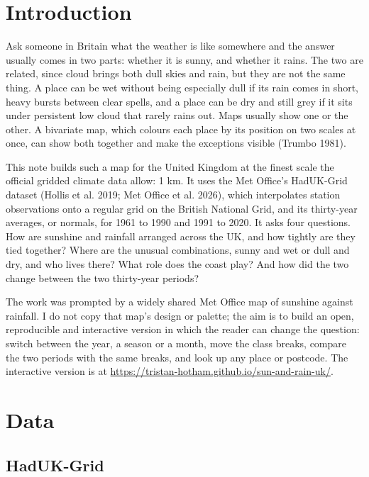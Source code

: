 \documentclass[11pt,a4paper]{article}
\begin{document}
\section{Introduction}

Ask someone in Britain what the weather is like somewhere and the answer usually comes in two parts: whether it is sunny, and whether it rains. The two are related, since cloud brings both dull skies and rain, but they are not the same thing. A place can be wet without being especially dull if its rain comes in short, heavy bursts between clear spells, and a place can be dry and still grey if it sits under persistent low cloud that rarely rains out. Maps usually show one or the other. A bivariate map, which colours each place by its position on two scales at once, can show both together and make the exceptions visible (Trumbo 1981).

This note builds such a map for the United Kingdom at the finest scale the official gridded climate data allow: 1 km. It uses the Met Office's HadUK-Grid dataset (Hollis et al. 2019; Met Office et al. 2026), which interpolates station observations onto a regular grid on the British National Grid, and its thirty-year averages, or normals, for 1961 to 1990 and 1991 to 2020. It asks four questions. How are sunshine and rainfall arranged across the UK, and how tightly are they tied together? Where are the unusual combinations, sunny and wet or dull and dry, and who lives there? What role does the coast play? And how did the two change between the two thirty-year periods?

The work was prompted by a widely shared Met Office map of sunshine against rainfall. I do not copy that map's design or palette; the aim is to build an open, reproducible and interactive version in which the reader can change the question: switch between the year, a season or a month, move the class breaks, compare the two periods with the same breaks, and look up any place or postcode. The interactive version is at \url{https://tristan-hotham.github.io/sun-and-rain-uk/}.

\section{Data}

\subsection{HadUK-Grid}
\end{document}
